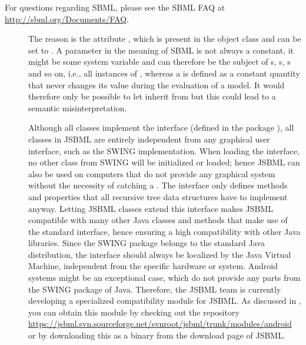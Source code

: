 
For questions regarding SBML, please see the SBML FAQ at
\url{http://sbml.org/Documents/FAQ}.

\begin{description}

\item[\parbox{\textwidth-5pt}{Why does the class \LocalParameter not inherit
    from \Parameter?}]

  The reason is the \Boolean attribute ,%
  which is present
  in the \Parameter object class and can be set to . A parameter in
  the meaning of SBML is not always a constant, it might be some system
  variable \Variable and can therefore be the subject of s,
   \Event{}s, \InitialAssignment{}s and so on, i.e., all
  instances of , whereas a \LocalParameter is defined as a
  constant quantity that never changes its value during the evaluation of a
  model. It would therefore only be possible to let \Parameter
  inherit from \LocalParameter but this could lead to a semantic
  misinterpretation.

\item[\parbox{\textwidth-5pt}{Does JSBML depend on SWING or any particular
    graphical user interface implementation?}]

  Although all classes implement the \TreeNode interface (defined in
  the package ), all classes in JSBML are entirely
  independent from any graphical user interface, such as the
  SWING
  implementation. When loading the \TreeNode interface, no other
  class from SWING will be initialized or loaded; hence JSBML can also be
  used on computers that do not provide any graphical system without the
  necessity of catching a \HeadlessException. The \TreeNode
  interface only defines methods and properties that all recursive tree data
  structures have to implement anyway. Letting JSBML classes extend this
  interface makes JSBML compatible with many other Java classes and methods
  that make use of the standard \TreeNode interface, hence ensuring a
  high compatibility with other Java libraries. Since the SWING package
  belongs to the standard Java distribution, the
  \TreeNode interface should always be localized by the Java Virtual
  Machine, independent from the specific hardware or
  system. Android systems might be an exceptional case, which
  do not provide any parts from the SWING package of Java. Therefore, the
  JSBML team is currently developing a specialized 
  compatibility module for JSBML. As discussed in ,
  you can obtain this module by checking out the repository
  \url{https://jsbml.svn.sourceforge.net/svnroot/jsbml/trunk/modules/android} or by
  downloading this as a binary from the download page of JSBML.


\end{description}
